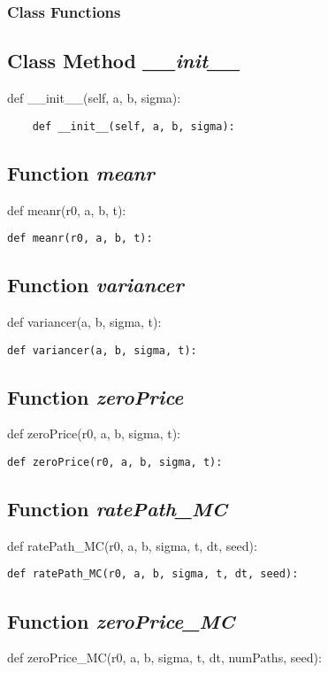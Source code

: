 \documentclass[twoside,11pt]{book}
\begin{document}
\subsubsection{Class Functions}

\subsection{Class Method {\it \_\_init\_\_}}
def \_\_init\_\_(self, a, b, sigma):

\begin{lstlisting}
    def __init__(self, a, b, sigma):
\end{lstlisting}

\subsection{Function {\it meanr}}
def meanr(r0, a, b, t):

\begin{lstlisting}
def meanr(r0, a, b, t):
\end{lstlisting}

\subsection{Function {\it variancer}}
def variancer(a, b, sigma, t):

\begin{lstlisting}
def variancer(a, b, sigma, t):
\end{lstlisting}

\subsection{Function {\it zeroPrice}}
def zeroPrice(r0, a, b, sigma, t):

\begin{lstlisting}
def zeroPrice(r0, a, b, sigma, t):
\end{lstlisting}

\subsection{Function {\it ratePath\_MC}}
def ratePath\_MC(r0, a, b, sigma, t, dt, seed):

\begin{lstlisting}
def ratePath_MC(r0, a, b, sigma, t, dt, seed):
\end{lstlisting}

\subsection{Function {\it zeroPrice\_MC}}
def zeroPrice\_MC(r0, a, b, sigma, t, dt, numPaths, seed):
\end{document}
